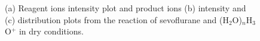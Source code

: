 \begin{figure}%
\centering
{}



\caption{(a) Reagent ions intensity plot and product ions  (b) intensity and (c) distribution plots from the reaction of sevoflurane and (H$_2$O)$_n$H$_3$O$^+$ in dry conditions.}
\label{fig:sevo_h3o}
\end{figure}



